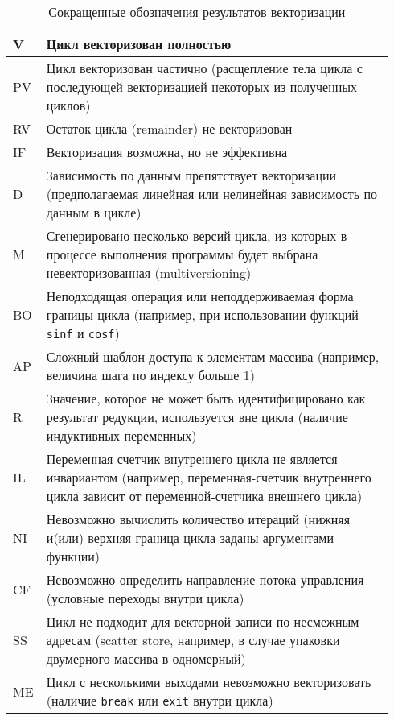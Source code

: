 \begin{table}[h!]
\caption{Сокращенные обозначения результатов векторизации}
\label{table:abbr}
\centering
\footnotesize
\begin{tabular}{|C{0.04\linewidth}|L{0.9\linewidth}|}
\hline
{}V & Цикл векторизован полностью \\
\hline
{}PV & Цикл векторизован частично (расщепление тела цикла с последующей векторизацией некоторых из полученных циклов) \\
\hline
{}RV & Остаток цикла (remainder) не векторизован\\
\hline
{}IF & Векторизация возможна, но не эффективна\\
\hline
{}D & Зависимость по данным препятствует векторизации (предполагаемая линейная или нелинейная зависимость по данным в цикле)\\ 
\hline
{}M & Сгенерировано несколько версий цикла, из которых в процессе выполнения программы будет выбрана невекторизованная (multiversioning)\\  
\hline
{}BO & Неподходящая операция или неподдерживаемая форма границы цикла (например, при использовании функций \texttt{sinf} и \texttt{cosf})\\
\hline
{}AP & Сложный шаблон доступа к элементам массива (например, величина шага по индексу больше 1)\\ 
\hline
{}R & Значение, которое не может быть идентифицировано как результат редукции, используется вне цикла (наличие индуктивных переменных)\\ 
\hline
{}IL & Переменная-счетчик внутреннего цикла не является инвариантом (например, переменная-счетчик внутреннего цикла зависит от переменной-счетчика внешнего цикла)\\
\hline
{}NI & Невозможно вычислить количество итераций (нижняя и(или) верхняя граница цикла заданы аргументами функции)\\
\hline
{}CF & Невозможно определить направление потока управления (условные переходы внутри цикла)\\
\hline
{}SS & Цикл не подходит для векторной записи по несмежным адресам (scatter store, например, в случае упаковки двумерного массива в одномерный)\\ 
\hline
{}ME & Цикл с несколькими выходами невозможно векторизовать (наличие \texttt{break} или \texttt{exit} внутри цикла)\\ 

\end{tabular}
\end{table}
